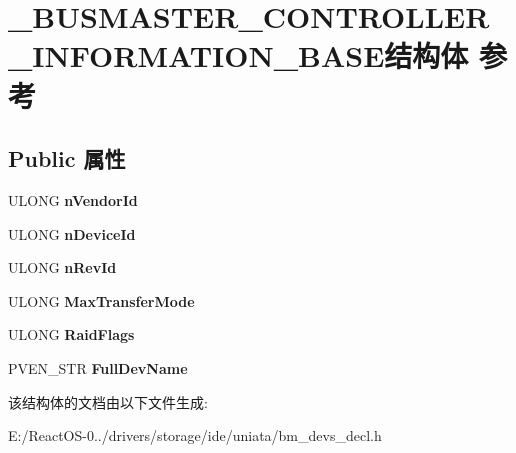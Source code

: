 \hypertarget{struct___b_u_s_m_a_s_t_e_r___c_o_n_t_r_o_l_l_e_r___i_n_f_o_r_m_a_t_i_o_n___b_a_s_e}{}\section{\+\_\+\+B\+U\+S\+M\+A\+S\+T\+E\+R\+\_\+\+C\+O\+N\+T\+R\+O\+L\+L\+E\+R\+\_\+\+I\+N\+F\+O\+R\+M\+A\+T\+I\+O\+N\+\_\+\+B\+A\+S\+E结构体 参考}
\label{struct___b_u_s_m_a_s_t_e_r___c_o_n_t_r_o_l_l_e_r___i_n_f_o_r_m_a_t_i_o_n___b_a_s_e}
\subsection*{Public 属性}
\begin{DoxyCompactItemize}
\item 
\mbox{\label{struct___b_u_s_m_a_s_t_e_r___c_o_n_t_r_o_l_l_e_r___i_n_f_o_r_m_a_t_i_o_n___b_a_s_e_a70ea1ddc53a66099fe892f6d436216b4}} 
U\+L\+O\+NG {\bfseries n\+Vendor\+Id}
\item 
\mbox{\label{struct___b_u_s_m_a_s_t_e_r___c_o_n_t_r_o_l_l_e_r___i_n_f_o_r_m_a_t_i_o_n___b_a_s_e_a7c985d011f4a988cdf5223cc2eb8bbf1}} 
U\+L\+O\+NG {\bfseries n\+Device\+Id}
\item 
\mbox{\label{struct___b_u_s_m_a_s_t_e_r___c_o_n_t_r_o_l_l_e_r___i_n_f_o_r_m_a_t_i_o_n___b_a_s_e_a36fff8ea91f7f3dd98249d2a1c9f1571}} 
U\+L\+O\+NG {\bfseries n\+Rev\+Id}
\item 
\mbox{\label{struct___b_u_s_m_a_s_t_e_r___c_o_n_t_r_o_l_l_e_r___i_n_f_o_r_m_a_t_i_o_n___b_a_s_e_ae7ae9fdb1f2154fe97344fb4c5235398}} 
U\+L\+O\+NG {\bfseries Max\+Transfer\+Mode}
\item 
\mbox{\label{struct___b_u_s_m_a_s_t_e_r___c_o_n_t_r_o_l_l_e_r___i_n_f_o_r_m_a_t_i_o_n___b_a_s_e_a7ed4a0cc826bf878985575a89ca7e83a}} 
U\+L\+O\+NG {\bfseries Raid\+Flags}
\item 
\mbox{\label{struct___b_u_s_m_a_s_t_e_r___c_o_n_t_r_o_l_l_e_r___i_n_f_o_r_m_a_t_i_o_n___b_a_s_e_a2d9445488a36c778a54e543861f6c14e}} 
P\+V\+E\+N\+\_\+\+S\+TR {\bfseries Full\+Dev\+Name}
\end{DoxyCompactItemize}


该结构体的文档由以下文件生成\+:\begin{DoxyCompactItemize}
\item 
E\+:/\+React\+O\+S-\/0../drivers/storage/ide/uniata/bm\+\_\+devs\+\_\+decl.\+h\end{DoxyCompactItemize}

